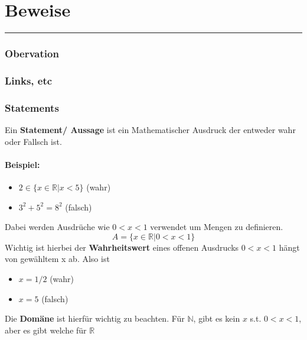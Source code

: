 \newcommand{\defbox}[2]{
\vspace{1cm}
\noindent
    \begin{tcolorbox}
        [colframe=red, colback=white, width=\linewidth, title=#1]
        #2
    \end{tcolorbox}
    \vspace{1cm}
}

\newcommand{\proofbox}[3]{%
    \begin{proof}
        \\ \textbf{Annahme:}
        \begin{align*}
            #1
        \end{align*}
        \textbf{Zeige:} #2
        \begin{align*}
            #3
        \end{align*}
    \end{proof}%
}


\section{Beweise}
    \rule{\textwidth}{0.4pt}
    \subsubsection{Obervation}
    \subsubsection{Links, etc}
    \subsubsection{Statements}
        Ein \textbf{Statement/ Aussage} ist ein Mathematischer Ausdruck der entweder wahr oder Fallsch ist.
        \paragraph{Beispiel: } 
        \begin{itemize}
            \item $2 \in \{x \in \mathbb{R} \vert x < 5\}$ (wahr)
            \item $3^2 + 5^2 = 8^2$ (falsch)
        \end{itemize} 
        Dabei werden Ausdrüche wie $0 < x < 1$ verwendet um Mengen zu definieren. \[A = \{x\in\mathbb{R} \vert 0 < x < 1\}\] Wichtig ist hierbei der \textbf{Wahrheitswert} eines offenen Ausdrucks $0 < x < 1$ hängt von gewähltem x ab. Also ist 
        \begin{itemize}
            \item $x = 1/2$ (wahr) 
            \item $x = 5 $ (falsch)
        \end{itemize}
        Die \textbf{Domäne} ist hierfür wichtig zu beachten. Für $\mathbb{N}$, gibt es kein $x$ s.t. $0 < x < 1$, aber es gibt welche für $\mathbb{R}$


